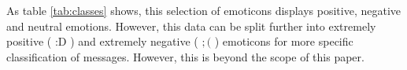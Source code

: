 As table \ref{tab:classes} shows, this selection of emoticons displays positive, negative and neutral emotions. However, this data can be split further into extremely positive ( :D ) and extremely negative ( $;($ ) emoticons for more specific classification of messages. However, this is beyond the scope of this paper.

\begin{comment}
\red{Finish the introduction, maybe move some parts to the Problem section} \\



\begin{comment}
Introduction (max 2 pages):
• Description of the problem area and the problem itself
• What is the research question / goal?
• Why is this an important / meaningful / interesting problem to consider?
• The very basic idea of the approach and why this is a reasonable approach for this problem?
\end{comment}

